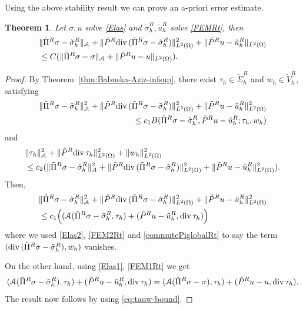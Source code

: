 \documentclass[12pt]{amsart}
\numberwithin{equation}{section}
\newtheorem{theorem}{Theorem}[section]
\theoremstyle{definition}
\theoremstyle{remark}
\renewcommand{\(}{\bigl(}
\renewcommand{\)}{\bigr)}
\newcommand{\tsigma}{\tilde{\sigma}}
\newcommand{\tu}{\tilde{u}}
\newcommand{\dive}{{\ensuremath\mathop{\mathrm{div}\,}}} %
\newcommand{\Aa}{\mathcal{A}}
\begin{document}
Using the above stability result we can prove an a-priori error estimate.
\begin{theorem}
\label{thm:FEMRt-error-estimate}
Let $\sigma, u$ solve \eqref{Elas}  and $\tsigma^R_h, \tu^R_h$ solve \eqref{FEMRt}, then
\begin{alignat*}{1}
& \|\tilde{\Pi}^R \sigma-\tsigma^R_h \|_{\Aa} +  \|\tilde{P}^R \dive ( \tilde{\Pi}^R \sigma-\tsigma^R_h)  \|_{L^2(\Omega)}^2+ \| \tilde{P}^R u-\tu^R_h \|_{L^2(\Omega)} \\
&\le C (\|\tilde{\Pi}^R \sigma-\sigma \|_{\Aa} +
  \| \tilde{P}^R u-u \|_{L^2(\Omega)}).
\end{alignat*}
\end{theorem}
\begin{proof}
By Theorem~\ref{thm:Babuska-Aziz-infsup}, there exist $\tau_h \in \tilde{\Sigma}^R_h$ and $w_h \in \tilde{V}_h^R$, satisfying
\begin{alignat*}{1}
\| \tilde{\Pi}^R \sigma-\tsigma^R_h\|_{\Aa}^2+ \|\tilde{P}^R \dive ( \tilde{\Pi}^R \sigma-\tsigma^R_h)\|_{L^2(\Omega)}^2+\|\tilde{P}^R u-\tu^R_h\|_{L^2(\Omega)}^2 \\
\le c_1  B(\tilde{\Pi}^R \sigma-\tsigma^R_h, \tilde{P}^R u-\tu^R_h; \tau_h, w_h)
\end{alignat*}
and
\begin{alignat}{1} \label{eq:tauw-bound}
 &  \|\tau_h\|_{\Aa}^2+ \|\tilde{P}^R \dive \tau_h\|_{L^2(\Omega)}^2 + \|w_h\|_{L^2(\Omega)}^2  \nonumber \\
 & \le  c_2 (\| \tilde{\Pi}^R \sigma-\tsigma^R_h\|_{\Aa}^2+ \|\tilde{P}^R \dive (\tilde{\Pi}^R \sigma-\tsigma^R_h)\|_{L^2(\Omega)}^2+\|\tilde{P}^R u-\tu^R_h\|_{L^2(\Omega)}^2). 
\end{alignat}
Then, 
\begin{alignat*}{1}
& \|\tilde{\Pi}^R \sigma-\tsigma^R_h \|_{\Aa}^2+ \|\tilde{P}^R \dive ( \tilde{\Pi}^R \sigma-\tsigma^R_h)  \|_{L^2(\Omega)}^2+\| \tilde{P}^R u-\tu^R_h \|_{L^2(\Omega)}^2 \\ 
&\le c_1 \Big( (\Aa (\tilde{\Pi}^R \sigma-\tsigma^R_h, \tau_h)+(\tilde{P}^R u-\tu^R_h , \dive \tau_h) \Big)
\end{alignat*}
where we used \eqref{Elas2}, \eqref{FEM2Rt} and \eqref{commutePiglobalRt} to say the term $(\dive(\tilde{\Pi}^R \sigma-\tsigma^R_h) , w_h)$ vanishes.

On the other hand, using \eqref{Elas1}, \eqref{FEM1Rt} we get
\begin{alignat*}{1}
(\Aa (\tilde{\Pi}^R \sigma-\tsigma^R_h), \tau_h)+(\tilde{P}^R u-\tu^R_h , \dive \tau_h)= (\Aa (\tilde{\Pi}^R \sigma-\sigma), \tau_h)+(\tilde{P}^R u-u , \dive \tau_h).
\end{alignat*}
The result now follows by using \eqref{eq:tauw-bound}.
\end{proof}
\end{document}
